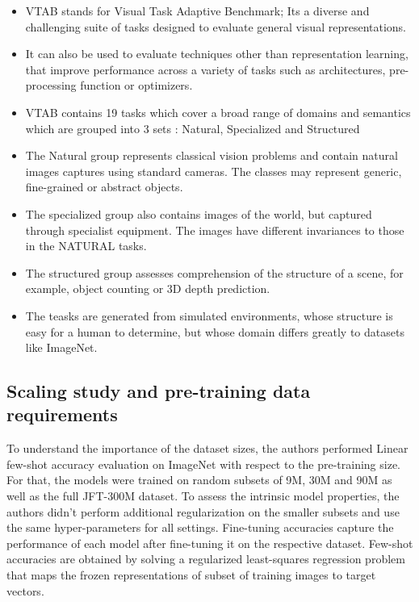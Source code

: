 \documentclass[conference]{IEEEtran}
\begin{document}
\begin{itemize}
    \item VTAB stands for Visual Task Adaptive Benchmark; Its a diverse and challenging suite of tasks designed to evaluate general visual representations.
    \item It can also be used to evaluate techniques other than representation learning, that improve performance across a variety of tasks such as architectures, pre-processing function or optimizers.
    \item VTAB contains 19 tasks which cover a broad range of domains and semantics which are grouped into 3 sets : Natural, Specialized and Structured
    \item The Natural group represents classical vision problems and contain natural images captures using standard cameras. The classes may represent generic, fine-grained or abstract objects.
    \item The specialized group also contains images of the world, but captured through specialist equipment. The images have different invariances to those in the NATURAL tasks.
    \item The structured group assesses comprehension of the structure of a scene, for example, object counting or 3D depth prediction. 
    \item The teasks are generated from simulated environments, whose structure is easy for a human to determine, but whose domain differs greatly to datasets like ImageNet.

\end{itemize}


\subsection{Scaling study and pre-training data requirements}

To understand the importance of the dataset sizes, the authors performed Linear few-shot accuracy evaluation on ImageNet with respect to the pre-training size. 
For that, the models were trained on random subsets of 9M, 30M and 90M as well as the full JFT-300M dataset. 
To assess the intrinsic model properties, the authors didn't perform additional regularization on the smaller subsets and use the same hyper-parameters for all settings.
Fine-tuning accuracies capture the performance of each model after fine-tuning it on the respective dataset. Few-shot accuracies are obtained by solving a regularized least-squares regression problem that maps the frozen representations of subset of training images to target vectors.
\end{document}
